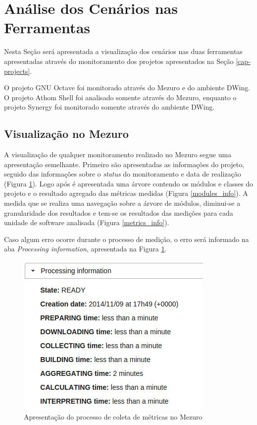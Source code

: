 \section{Análise dos Cenários nas Ferramentas}

Nesta Seção será apresentada a visualização dos cenários nas duas ferramentas apresentadas através do monitoramento dos projetos apresentados na Seção \ref{cap-projects}.

O projeto GNU Octave foi monitorado através do Mezuro e do ambiente DWing. O projeto Athom Shell foi analisado somente através do Mezuro, enquanto o projeto Synergy foi monitorado somente através do ambiente DWing.

\subsection{Visualização no Mezuro}
\label{vision-mezuro}

A visualização de qualquer monitoramento realizado no Mezuro segue uma apresentação semelhante. Primeiro são apresentadas as informações do projeto, seguido das informações sobre o \emph{status} do monitoramento e data de realização (Figura \ref{proc_info}). Logo após é apresentada uma árvore contendo os módulos e classes do projeto e o resultado agregado das métricas medidas  (Figura \ref{modules_info}). A medida que se realiza uma navegação sobre a árvore de módulos, diminui-se a granularidade dos resultados e tem-se os resultados das medições para cada unidade de software analisada (Figura \ref{metrics_info}).

Caso algum erro ocorre durante o processo de medição, o erro será informado na aba \emph{Processing information}, apresentada na Figura \ref{proc_info}. 

\begin{figure}[H]
	\centering
		\includegraphics[scale=0.5]{figuras/proc_info}
		\caption{Apresentação do processo de coleta de métricas no Mezuro}
		\label{proc_info}
\end{figure}

